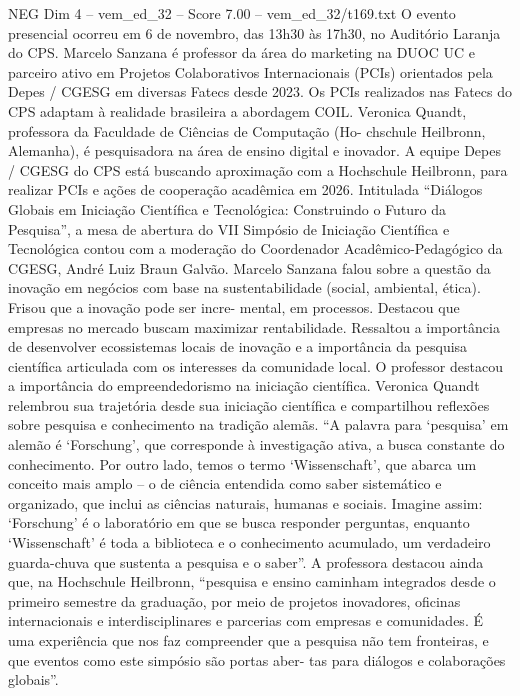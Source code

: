 \begin{textsample}{NEG Dim 4 – vem\_ed\_32 – Score 7.00 – vem\_ed\_32/t169.txt}
O evento presencial ocorreu em 6 de novembro, das 13h30 às 17h30, no Auditório Laranja do CPS.
Marcelo Sanzana é professor da área do marketing na DUOC UC e parceiro ativo em Projetos Colaborativos Internacionais (PCIs) orientados pela Depes / CGESG em diversas Fatecs desde 2023.
Os PCIs realizados nas Fatecs do CPS adaptam à realidade brasileira a abordagem COIL.
Veronica Quandt, professora da Faculdade de Ciências de Computação (Ho- chschule Heilbronn, Alemanha), é pesquisadora na área de ensino digital e inovador.
A equipe Depes / CGESG do CPS está buscando aproximação com a Hochschule Heilbronn, para realizar PCIs e ações de cooperação acadêmica em 2026.
Intitulada “Diálogos Globais em Iniciação Científica e Tecnológica: Construindo o Futuro da Pesquisa”, a mesa de abertura do VII Simpósio de Iniciação Científica e Tecnológica contou com a moderação do Coordenador Acadêmico-Pedagógico da CGESG, André Luiz Braun Galvão.
Marcelo Sanzana falou sobre a questão da inovação em negócios com base na sustentabilidade (social, ambiental, ética).
Frisou que a inovação pode ser incre- mental, em processos.
Destacou que empresas no mercado buscam maximizar rentabilidade.
Ressaltou a importância de desenvolver ecossistemas locais de inovação e a importância da pesquisa científica articulada com os interesses da comunidade local.
O professor destacou a importância do empreendedorismo na iniciação científica.
Veronica Quandt relembrou sua trajetória desde sua iniciação científica e compartilhou reflexões sobre pesquisa e conhecimento na tradição alemãs. “A palavra para ‘pesquisa’ em alemão é ‘Forschung’, que corresponde à investigação ativa, a busca constante do conhecimento.
Por outro lado, temos o termo ‘Wissenschaft’, que abarca um conceito mais amplo – o de ciência entendida como saber sistemático e organizado, que inclui as ciências naturais, humanas e sociais.
Imagine assim: ‘Forschung’ é o laboratório em que se busca responder perguntas, enquanto ‘Wissenschaft’ é toda a biblioteca e o conhecimento acumulado, um verdadeiro guarda-chuva que sustenta a pesquisa e o saber”.
A professora destacou ainda que, na Hochschule Heilbronn, “pesquisa e ensino caminham integrados desde o primeiro semestre da graduação, por meio de projetos inovadores, oficinas internacionais e interdisciplinares e parcerias com empresas e comunidades.
É uma experiência que nos faz compreender que a pesquisa não tem fronteiras, e que eventos como este simpósio são portas aber- tas para diálogos e colaborações globais”.

\end{textsample}

